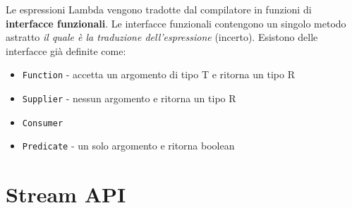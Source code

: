 Le espressioni Lambda vengono tradotte dal compilatore in funzioni di \textbf{interfacce funzionali}. Le interfacce funzionali contengono un singolo metodo astratto \textit{il quale è la traduzione dell'espressione} (incerto). Esistono delle interfacce già definite come:
\begin{itemize}
\item \texttt{Function} - accetta un argomento di tipo T e ritorna un tipo R
\item \texttt{Supplier} - nessun argomento e ritorna un tipo R
\item \texttt{Consumer} 
\item \texttt{Predicate} - un solo argomento e ritorna boolean 
\end{itemize}

\section{Stream API}

